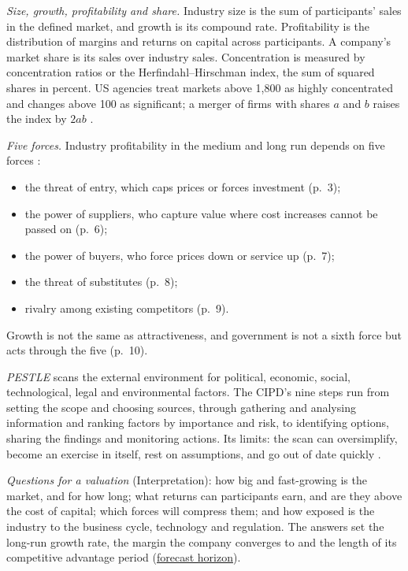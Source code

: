 \begin{qfmethod}
\emph{Size, growth, profitability and share.} Industry size is the sum of participants' sales in the defined market, and growth is its compound rate. Profitability is the distribution of margins and returns on capital across participants. A company's market share is its sales over industry sales. Concentration is measured by concentration ratios or the Herfindahl--Hirschman index, the sum of squared shares in percent. US agencies treat markets above 1,800 as highly concentrated and changes above 100 as significant; a merger of firms with shares $a$ and $b$ raises the index by $2ab$ \citep[pp.~5--6 and nn.~13--14]{merger-guidelines-2023}.

\emph{Five forces.} Industry profitability in the medium and long run depends on five forces \citep[pp.~2--3, 10]{five-competitive-forces-2008}:
\begin{itemize}
\item the threat of entry, which caps prices or forces investment (p.~3);
\item the power of suppliers, who capture value where cost increases cannot be passed on (p.~6);
\item the power of buyers, who force prices down or service up (p.~7);
\item the threat of substitutes (p.~8);
\item rivalry among existing competitors (p.~9).
\end{itemize}
Growth is not the same as attractiveness, and government is not a sixth force but acts through the five (p.~10).

\emph{PESTLE} scans the external environment for political, economic, social, technological, legal and environmental factors. The CIPD's nine steps run from setting the scope and choosing sources, through gathering and analysing information and ranking factors by importance and risk, to identifying options, sharing the findings and monitoring actions. Its limits: the scan can oversimplify, become an exercise in itself, rest on assumptions, and go out of date quickly \citep[sections on the definition, the nine steps and the limitations]{cipd-pestle-2026}.

\emph{Questions for a valuation} (Interpretation): how big and fast-growing is the market, and for how long; what returns can participants earn, and are they above the cost of capital; which forces will compress them; and how exposed is the industry to the business cycle, technology and regulation. The answers set the long-run growth rate, the margin the company converges to and the length of its competitive advantage period (\hyperref[meth:forecast-horizon-steady-state]{forecast horizon}).


\end{qfmethod}
